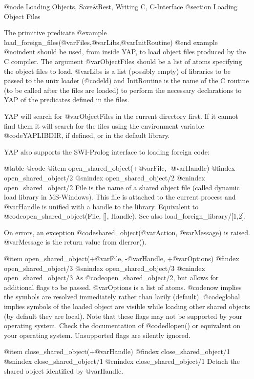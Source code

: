 {{{{{{{{@node Loading Objects, Save&Rest, Writing C, C-Interface
@section Loading Object Files

The primitive predicate
@example
      load_foreign_files(@var{Files},@var{Libs},@var{InitRoutine})
@end example
@noindent
should be used, from inside YAP, to load object files produced by the C
compiler. The argument @var{ObjectFiles} should be a list of atoms
specifying the object files to load, @var{Libs} is a list (possibly
empty) of libraries to be passed to the unix loader (@code{ld}) and
InitRoutine is the name of the C routine (to be called after the files
are loaded) to perform the necessary declarations to YAP of the
predicates defined in the files. 

YAP will search for @var{ObjectFiles} in the current directory first. If
it cannot find them it will search for the files using the environment
variable @code{YAPLIBDIR}, if defined, or in the default library.

YAP also supports the SWI-Prolog interface to loading foreign code:

@table @code
@item open_shared_object(+@var{File}, -@var{Handle})
@findex open_shared_object/2
@snindex open_shared_object/2
@cnindex open_shared_object/2
    File is the name of a shared object file (called dynamic load
    library in MS-Windows). This file is attached to the current process
    and @var{Handle} is unified with a handle to the library. Equivalent to
    @code{open_shared_object(File, [], Handle)}. See also
    load_foreign_library/[1,2].

    On errors, an exception @code{shared_object}(@var{Action},
    @var{Message}) is raised. @var{Message} is the return value from
    dlerror().

@item open_shared_object(+@var{File}, -@var{Handle}, +@var{Options})
@findex open_shared_object/3
@snindex open_shared_object/3
@cnindex open_shared_object/3
    As @code{open_shared_object/2}, but allows for additional flags to
    be passed. @var{Options} is a list of atoms. @code{now} implies the
    symbols are 
    resolved immediately rather than lazily (default). @code{global} implies
    symbols of the loaded object are visible while loading other shared
    objects (by default they are local). Note that these flags may not
    be supported by your operating system. Check the documentation of
    @code{dlopen()} or equivalent on your operating system. Unsupported
    flags  are silently ignored. 

@item close_shared_object(+@var{Handle})
@findex close_shared_object/1
@snindex close_shared_object/1
@cnindex close_shared_object/1
    Detach the shared object identified by @var{Handle}. 

}}}}}}}}
